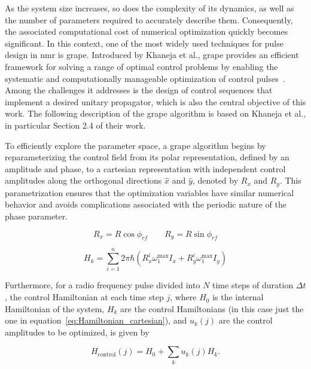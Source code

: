As the system size increases, so does the complexity of its dynamics, as well as the number of parameters required to accurately describe them. Consequently, the associated computational cost of numerical optimization quickly becomes significant. In this context, one of the most widely used techniques for pulse design in \acl{nmr} is \acl{grape}. Introduced by Khaneja et al., \acs{grape} provides an efficient framework for solving a range of optimal control problems by enabling the systematic and computationally manageable optimization of control pulses~\cite{khaneja2005optimal}. Among the challenges it addresses is the design of control sequences that implement a desired unitary propagator, which is also the central objective of this work. The following description of the \acs{grape} algorithm is based on Khaneja et al.\cite{khaneja2005optimal}, in particular Section 2.4 of their work.

To efficiently explore the parameter space, a \acs{grape} algorithm begins by reparameterizing the control field from its polar representation, defined by an amplitude and phase, to a cartesian representation with independent control amplitudes along the orthogonal directions \(\hat{x}\) and \(\hat{y}\), denoted by \(R_x\) and \(R_y\). This parametrization ensures that the optimization variables have similar numerical behavior and avoids complications associated with the periodic nature of the phase parameter.

\begin{equation}
    R_x = R\cos\phi_{rf}
    \qquad
    R_y = R\sin\phi_{rf}
\end{equation}

\begin{equation}
    H_{k}=\sum_{i=1}^{n}2\pi\hbar\left(R_x^i \omega_1^{\mathrm{\max}} I_x+R_y^i \omega_1^{\mathrm{\max}} I_y\right)
    \label{eq:Hamiltonian_cartesian}
\end{equation}

Furthermore, for a radio frequency pulse divided into \(N\) time steps of duration \(\Delta t\), the control Hamiltonian at each time step \(j\), where \(H_0\) is the internal Hamiltonian of the system, \(H_k\) are the control Hamiltonians (in this case just the one in equation~\ref{eq:Hamiltonian_cartesian}), and \(u_k(j)\) are the control amplitudes to be optimized, is given by

\begin{equation}
    H_{\mathrm{control}}(j)=H_0+\sum_k u_k(j)H_k.
\end{equation}


